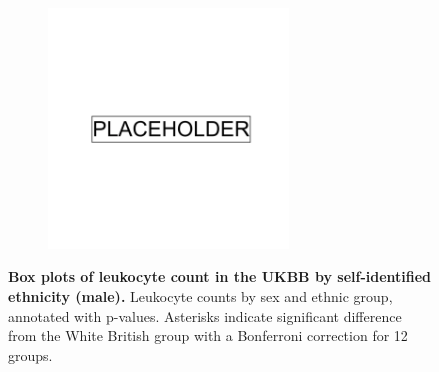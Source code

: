 \begin{figure}
    \centering
    \begin{subfigure}{\textwidth}
    \includegraphics[width=0.7\textwidth]{placeholder.png}
    \end{subfigure}
    \caption[Box plots of leukocyte count in the UKBB by self-identified ethnicity (male)]{\textbf{Box plots of leukocyte count in the UKBB by self-identified ethnicity (male).} Leukocyte counts by sex and ethnic group, annotated with p-values. Asterisks indicate significant difference from the White British group with a Bonferroni correction for 12 groups.}
    \label{fig:supp_box_leukocyte_m}
\end{figure}

\newpage


